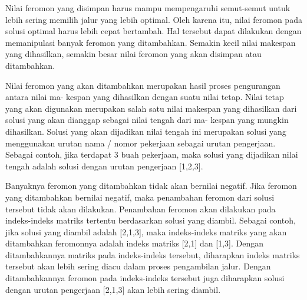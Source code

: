 	Nilai feromon yang disimpan harus mampu mempengaruhi semut-semut untuk lebih sering memilih
	jalur yang lebih optimal. Oleh karena itu, nilai feromon pada solusi optimal harus lebih cepat
	bertambah. Hal tersebut dapat dilakukan dengan memanipulasi banyak feromon yang ditambahkan.
	Semakin kecil nilai makespan yang dihasilkan, semakin besar nilai feromon yang akan disimpan
	atau ditambahkan.

	Nilai feromon yang akan ditambahkan merupakan hasil proses pengurangan antara nilai ma-
	kespan yang dihasilkan dengan suatu nilai tetap. Nilai tetap yang akan digunakan merupakan salah
	satu nilai makespan yang dihasilkan dari solusi yang akan dianggap sebagai nilai tengah dari ma-
	kespan yang mungkin dihasilkan. Solusi yang akan dijadikan nilai tengah ini merupakan solusi yang
	menggunakan urutan nama / nomor pekerjaan sebagai urutan pengerjaan. Sebagai contoh, jika
	terdapat 3 buah pekerjaan, maka solusi yang dijadikan nilai tengah adalah solusi dengan urutan
	pengerjaan [1,2,3].

	Banyaknya feromon yang ditambahkan tidak akan bernilai negatif. Jika feromon yang ditambahkan
	bernilai negatif, maka penambahan feromon dari solusi tersebut tidak akan dilakukan. Penambahan
	feromon akan dilakukan pada indeks-indeks matriks tertentu berdasarkan solusi yang
	diambil. Sebagai contoh, jika solusi yang diambil adalah [2,1,3], maka indeks-indeks matriks yang
	akan ditambahkan feromonnya adalah indeks matriks [2,1] dan [1,3]. Dengan ditambahkannya
	matriks pada indeks-indeks tersebut, diharapkan indeks matriks tersebut akan lebih sering diacu
	dalam proses pengambilan jalur. Dengan ditambahkannya feromon pada indeks-indeks tersebut
	juga diharapkan solusi dengan urutan pengerjaan [2,1,3] akan lebih sering diambil.


